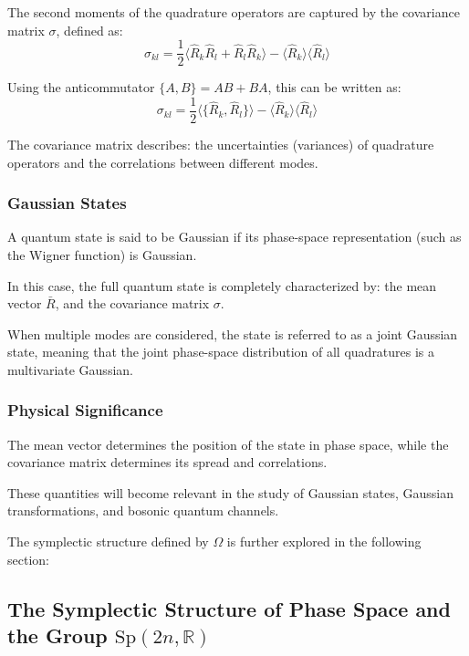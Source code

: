 The second moments of the quadrature operators are captured by the covariance matrix $\sigma$, defined as:
\begin{equation}
\sigma_{kl}
=
\frac{1}{2}
\langle \hat{R}_k \hat{R}_l + \hat{R}_l \hat{R}_k \rangle
-
\langle \hat{R}_k \rangle \langle \hat{R}_l \rangle
\label{cov_mat}
\end{equation}

Using the anticommutator $\{A,B\} = AB + BA$, this can be written as:
\begin{equation}
\sigma_{kl}
=
\frac{1}{2}
\langle \{ \hat{R}_k, \hat{R}_l \} \rangle
-
\langle \hat{R}_k \rangle \langle \hat{R}_l \rangle
\end{equation}

The covariance matrix describes: the uncertainties (variances) of quadrature operators and the correlations between different modes.

\subsubsection*{Gaussian States}

A quantum state is said to be Gaussian if its phase-space representation (such as the Wigner function) is Gaussian.

In this case, the full quantum state is completely characterized by: the mean vector $\bar{R}$, and the covariance matrix $\sigma$.

When multiple modes are considered, the state is referred to as a joint Gaussian state, meaning that the joint phase-space distribution of all quadratures is a multivariate Gaussian.

\subsubsection*{Physical Significance}

The mean vector determines the position of the state in phase space, while the covariance matrix determines its spread and correlations.

These quantities will become relevant in the study of Gaussian states, Gaussian transformations, and bosonic quantum channels.

The symplectic structure defined by $\Omega$ is further explored in the following section: 


\subsection{The Symplectic Structure of Phase Space and the Group $\mathrm{Sp}(2n,\mathbb{R})$}

